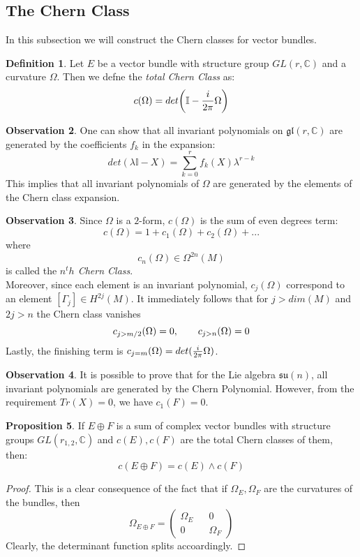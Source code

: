 \documentclass[12pt,a4paper]{report}
\theoremstyle{definition}
\newtheorem{Def}{Definition}[chapter]
\theoremstyle{Theorem}
\newtheorem{Prop}[Def]{Proposition}
\theoremstyle{definition}
\theoremstyle{definition}
\newtheorem{Obs}[Def]{Observation}
\begin{document}
	\subsection{The Chern Class}
	In this subsection we will construct the Chern classes for vector bundles.
	\begin{Def}
		Let $E$ be a vector bundle with structure group $GL(r,\mathbb{C})$ and a curvature $\Omega$. Then we defne the \textit{total Chern Class} as:
		$$c(\Omega)=det\bigg(\mathbb{I}-{i\over 2\pi}\Omega\bigg)$$ 
	\end{Def}
	\begin{Obs}
		One can show that all invariant polynomials on $\mathfrak{gl}(r,\mathbb{C})$ are generated by the coefficients $f_k$ in the expansion:
		$$det(\lambda\mathbb{I}-X)=\sum_{k=0}^r f_k(X)\lambda^{r-k}$$
		This implies that all invariant polynomials of $\Omega$ are generated by the elements of the Chern class expansion.
	\end{Obs}
	\begin{Obs}
		Since $\Omega$ is a $2$-form, $c(\Omega)$ is the sum of even degrees term:
		$$c(\Omega)=1+c_1(\Omega)+c_2(\Omega)+...$$
		where $$c_n(\Omega)\in\Omega^{2n}(M)$$
		is called the \textit{$n^th$ Chern Class}.\\
		Moreover, since each element is an invariant polynomial, $c_j(\Omega)$ correspond to an element $[\Gamma_j]\in H^{2j}(M)$. It immediately follows that for $j>dim(M)$ and $2j>n$ the Chern class vanishes 
		$$c_{j>m/2}(\Omega)=0,\hspace{20 pt}c_{j>n}(\Omega)=0$$
		Lastly, the finishing term is $c_{j=m}(\Omega)=det({i\over 2\pi}\Omega)$.
	\end{Obs}
	\begin{Obs}
		It is possible to prove that for the Lie algebra $\mathfrak{su}(n)$, all invariant polynomials are generated by the Chern Polynomial. However, from the requirement $Tr(X)=0$, we have $c_1(F)=0$.
	\end{Obs}
	\begin{Prop}
		If $E\oplus F$ is a sum of complex vector bundles with structure groups $GL(r_{1,2},\mathbb{C})$ and $c(E),c(F)$ are the total Chern classes of them, then:
		$$c(E\oplus F)=c(E)\wedge c(F)$$
	\end{Prop}
	\begin{proof}
		This is a clear consequence of the fact that if $\Omega_E,\Omega_F$ are the curvatures of the bundles, then $$\Omega_{E\oplus F}=\begin{pmatrix}
		\Omega_E && 0\\
		0&& \Omega_F
		\end{pmatrix}$$
		Clearly, the determinant function splits accoardingly.
	\end{proof}
\end{document}

